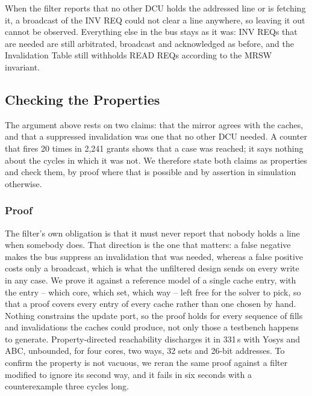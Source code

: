 \documentclass[conference]{IEEEtran}
\begin{document}
When the filter reports that no other DCU holds the addressed line or is
fetching it, a broadcast of the INV REQ could not clear a line anywhere, so
leaving it out cannot be observed. Everything
else in the bus stays as it was: INV REQs that are needed are still
arbitrated, broadcast and acknowledged as before, and the Invalidation Table
still withholds READ REQs according to the MRSW invariant.

\subsection{Checking the Properties}
\label{sec:sva}

The argument above rests on two claims: that the mirror agrees with the caches,
and that a suppressed invalidation was one that no other DCU needed. A counter
that fires 20 times in 2{,}241 grants shows that a case was reached; it says
nothing about the cycles in which it was not. We therefore state both claims as
properties and check them, by proof where that is possible and by assertion in
simulation otherwise.

\subsubsection{Proof}
The filter's own obligation is that it must never report that nobody holds a
line when somebody does. That direction is the one that matters: a false
negative makes the bus suppress an invalidation that was needed, whereas a
false positive costs only a broadcast, which is what the unfiltered design
sends on every write in any case. We prove it against a reference model of a
single cache entry, with the entry -- which core, which set, which way -- left
free for the solver to pick, so that a proof covers every entry of every cache
rather than one chosen by hand. Nothing constrains the update port, so the
proof holds for every sequence of fills and invalidations the caches could
produce, not only those a testbench happens to generate. Property-directed
reachability discharges it in 331\,s with Yosys and ABC, unbounded, for four
cores, two ways, 32 sets and 26-bit addresses. To confirm the property is not
vacuous, we reran the same proof against a filter modified to ignore its
second way, and it fails in six seconds with a counterexample three cycles
long.
\end{document}

